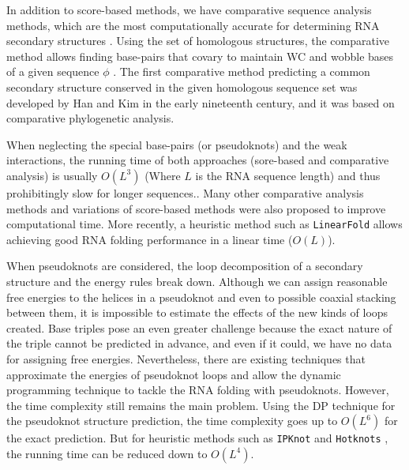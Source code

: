 In addition to score-based methods, we have comparative sequence analysis methods, which are the most computationally accurate for determining \ac{RNA} secondary structures \cite{gutell2002accuracy, madison1966nucleotide}. Using the set of homologous structures, the comparative method allows finding base-pairs that covary to maintain \ac{WC} and wobble bases of a given sequence $\phi$ \cite{gutell1985comparative}. The first comparative method predicting a common secondary structure conserved in the given homologous sequence set was developed by Han and Kim in the early nineteenth century, and it was based on comparative phylogenetic analysis. 

When neglecting the special base-pairs (or pseudoknots) and the weak interactions, the running time of both approaches (sore-based and comparative analysis) is usually $O(L^3)$ (Where $L$ is the \ac{RNA} sequence length) and thus prohibitingly slow for longer sequences.. Many other comparative analysis methods and variations of score-based methods were also proposed to improve computational time. More recently, a heuristic method such as \texttt{LinearFold} allows achieving good \ac{RNA} folding performance in a linear time ($O(L)$). 

When pseudoknots are considered, the loop decomposition of a secondary structure and the energy rules break down. Although we can assign reasonable free energies to the helices in a pseudoknot and even to possible coaxial stacking between them, it is impossible to estimate the effects of the new kinds of loops created. Base triples pose an even greater challenge because the exact nature of the triple cannot be predicted in advance, and even if it could, we have no data for assigning free energies.
Nevertheless, there are existing techniques that approximate the energies of pseudoknot loops and allow the dynamic programming technique to tackle the \ac{RNA} folding with pseudoknots. However, the time complexity still remains the main problem. Using the \ac{DP} technique for the pseudoknot structure prediction, the time complexity goes up to $O(L^6)$ for the exact prediction. But for heuristic methods such as \texttt{IPKnot} \cite{sato2011ipknot} and \texttt{Hotknots} \cite{ren2005hotknots}, the running time can be reduced down to $O(L^4)$. 


